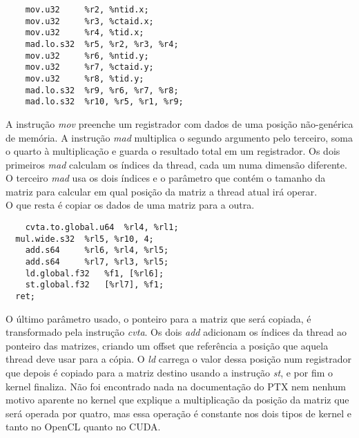 \begin{lstlisting}
    mov.u32 	%r2, %ntid.x;
    mov.u32 	%r3, %ctaid.x;
    mov.u32 	%r4, %tid.x;
    mad.lo.s32 	%r5, %r2, %r3, %r4;
    mov.u32 	%r6, %ntid.y;
    mov.u32 	%r7, %ctaid.y;
    mov.u32 	%r8, %tid.y;
    mad.lo.s32 	%r9, %r6, %r7, %r8;
    mad.lo.s32 	%r10, %r5, %r1, %r9;
\end{lstlisting}

A instrução \textit{mov} preenche um registrador com dados de uma posição não-genérica de memória. A instrução \textit{mad} multiplica o segundo argumento
pelo terceiro, soma o quarto à multiplicação e guarda o resultado total em um registrador. Os dois primeiros \textit{mad} calculam os índices da thread,
cada um numa dimensão diferente. O terceiro \textit{mad} usa os dois índices e o parâmetro que contém o tamanho da matriz para calcular em qual posição da 
matriz a thread atual irá operar. \\

O que resta é copiar os dados de uma matriz para a outra.

\begin{lstlisting}
	cvta.to.global.u64 	%rl4, %rl1;
  mul.wide.s32 	%rl5, %r10, 4;
	add.s64 	%rl6, %rl4, %rl5;
	add.s64 	%rl7, %rl3, %rl5;
	ld.global.f32 	%f1, [%rl6];
	st.global.f32 	[%rl7], %f1;
  ret;
\end{lstlisting}

O último parâmetro usado, o ponteiro para a matriz que será copiada, é transformado pela instrução \textit{cvta}. Os dois \textit{add} adicionam os índices
da thread ao ponteiro das matrizes, criando um offset que referência a posição que aquela thread deve usar para a cópia. O \textit{ld} carrega o valor dessa
posição num registrador que depois é copiado para a matriz destino usando a instrução \textit{st}, e por fim o kernel finaliza. Não foi encontrado nada
na documentação do PTX nem nenhum motivo aparente no kernel que explique a multiplicação da posição da matriz que será operada por quatro, mas essa operação
é constante nos dois tipos de kernel e tanto no OpenCL quanto no CUDA.
